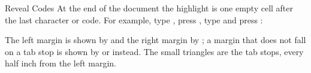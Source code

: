 \begin{Feature}{Reveal Codes}
At the end of the document the highlight is one empty cell after the
last character or code.  For example, type , press
, type  and press :
\EndReplay

The left margin is shown by \Scr{\{} and the right margin by \Scr{\}}; a
margin that does not fall on a tab stop is shown by \Scr{[} or \Scr{]}
instead.  The small triangles are the tab stops, every half inch from the
left margin.

\end{Feature}
